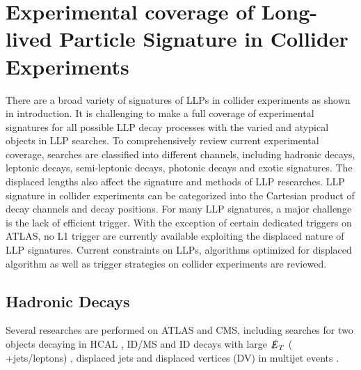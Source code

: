\section{Experimental coverage of Long-lived Particle Signature in Collider Experiments}

There are a broad variety of signatures of LLPs in collider experiments as shown in introduction. It is challenging to make a full coverage of experimental signatures for all possible LLP decay processes with the varied and atypical objects in LLP searches. To comprehensively review current experimental coverage, searches are classified into different channels, including hadronic decays, leptonic decays, semi-leptonic decays, photonic decays and exotic signatures. The displaced lengths also affect the signature and methods of LLP researches. LLP signature in collider experiments can be categorized into the Cartesian product of decay channels and decay positions. For many LLP signatures, a major challenge is the lack of efficient trigger. With the exception of certain dedicated triggers on ATLAS, no L1 trigger are currently available exploiting the displaced nature of LLP signatures. Current constraints on LLPs, algorithms optimized for displaced algorithm as well as trigger strategies on collider experiments are reviewed.

\subsection{Hadronic Decays}
Several researches are performed on ATLAS and CMS, including searches for two objects decaying in HCAL \cite{Aaboud:2019opc,Aad:2015asa}, ID/MS \cite{Aad:2015uaa,Aaboud:2018aqj} and ID decays with large $\slashed{E}_T$ ( +jets/leptons) \cite{Aaboud:2017iio,Aad:2015rba} , displaced jets \cite{Sirunyan:2018vlw,Sirunyan:2017jdo,CMS:2014wda} and displaced vertices (DV) in multijet events \cite{Sirunyan:2018pwn}. 

